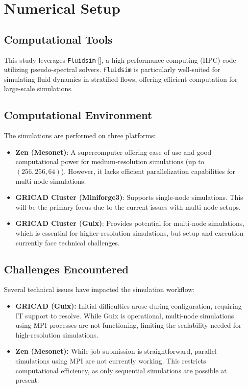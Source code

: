 \documentclass[final,5p,times,twocolumn,authoryear]{elsarticle}
\begin{document}
\section{Numerical Setup}

\subsection{Computational Tools}

This study leverages \texttt{Fluidsim} [\cite{fluiddyn}], a high-performance computing (HPC) code utilizing pseudo-spectral solvers. \texttt{Fluidsim} is particularly well-suited for simulating fluid dynamics in stratified flows, offering efficient computation for large-scale simulations.

\subsection{Computational Environment}

The simulations are performed on three platforms: 

\begin{itemize}
    \item \textbf{Zen (Mesonet)}: A supercomputer offering ease of use and good computational power for medium-resolution simulations (up to $(256, 256, 64)$). However, it lacks efficient parallelization capabilities for multi-node simulations.
    \item \textbf{GRICAD Cluster (Miniforge3)}: Supports single-node simulations. This will be the primary focus due to the current issues with multi-node setups.
    \item \textbf{GRICAD Cluster (Guix)}: Provides potential for multi-node simulations, which is essential for higher-resolution simulations, but setup and execution currently face technical challenges.
\end{itemize}

\subsection{Challenges Encountered}

Several technical issues have impacted the simulation workflow:

\begin{itemize}
    \item \textbf{GRICAD (Guix):} Initial difficulties arose during configuration, requiring IT support to resolve. While Guix is operational, multi-node simulations using MPI processes are not functioning, limiting the scalability needed for high-resolution simulations.
    \item \textbf{Zen (Mesonet):} While job submission is straightforward, parallel simulations using MPI are not currently working. This restricts computational efficiency, as only sequential simulations are possible at present.
\end{itemize}
\end{document}
